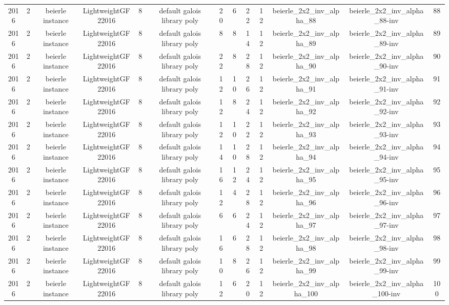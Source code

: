 \begin{tabular}{c c c c c c c c c c c c c}
2016 & 2 & beierle instance & LightweightGF22016 & 8 & default galois library poly & 20 & 6 & 22 & 12 & beierle_2x2_inv_alpha_88 & beierle_2x2_inv_alpha_88-inv & 88 \\
2016 & 2 & beierle instance & LightweightGF22016 & 8 & default galois library poly & 8 & 8 & 14 & 12 & beierle_2x2_inv_alpha_89 & beierle_2x2_inv_alpha_89-inv & 89 \\
2016 & 2 & beierle instance & LightweightGF22016 & 8 & default galois library poly & 22 & 8 & 28 & 12 & beierle_2x2_inv_alpha_90 & beierle_2x2_inv_alpha_90-inv & 90 \\
2016 & 2 & beierle instance & LightweightGF22016 & 8 & default galois library poly & 12 & 10 & 26 & 12 & beierle_2x2_inv_alpha_91 & beierle_2x2_inv_alpha_91-inv & 91 \\
2016 & 2 & beierle instance & LightweightGF22016 & 8 & default galois library poly & 12 & 8 & 24 & 12 & beierle_2x2_inv_alpha_92 & beierle_2x2_inv_alpha_92-inv & 92 \\
2016 & 2 & beierle instance & LightweightGF22016 & 8 & default galois library poly & 12 & 10 & 22 & 12 & beierle_2x2_inv_alpha_93 & beierle_2x2_inv_alpha_93-inv & 93 \\
2016 & 2 & beierle instance & LightweightGF22016 & 8 & default galois library poly & 14 & 10 & 28 & 12 & beierle_2x2_inv_alpha_94 & beierle_2x2_inv_alpha_94-inv & 94 \\
2016 & 2 & beierle instance & LightweightGF22016 & 8 & default galois library poly & 16 & 12 & 24 & 12 & beierle_2x2_inv_alpha_95 & beierle_2x2_inv_alpha_95-inv & 95 \\
2016 & 2 & beierle instance & LightweightGF22016 & 8 & default galois library poly & 12 & 4 & 28 & 12 & beierle_2x2_inv_alpha_96 & beierle_2x2_inv_alpha_96-inv & 96 \\
2016 & 2 & beierle instance & LightweightGF22016 & 8 & default galois library poly & 6 & 6 & 24 & 12 & beierle_2x2_inv_alpha_97 & beierle_2x2_inv_alpha_97-inv & 97 \\
2016 & 2 & beierle instance & LightweightGF22016 & 8 & default galois library poly & 16 & 6 & 28 & 12 & beierle_2x2_inv_alpha_98 & beierle_2x2_inv_alpha_98-inv & 98 \\
2016 & 2 & beierle instance & LightweightGF22016 & 8 & default galois library poly & 10 & 8 & 26 & 12 & beierle_2x2_inv_alpha_99 & beierle_2x2_inv_alpha_99-inv & 99 \\
2016 & 2 & beierle instance & LightweightGF22016 & 8 & default galois library poly & 12 & 6 & 20 & 12 & beierle_2x2_inv_alpha_100 & beierle_2x2_inv_alpha_100-inv & 100 \\

\end{tabular}
